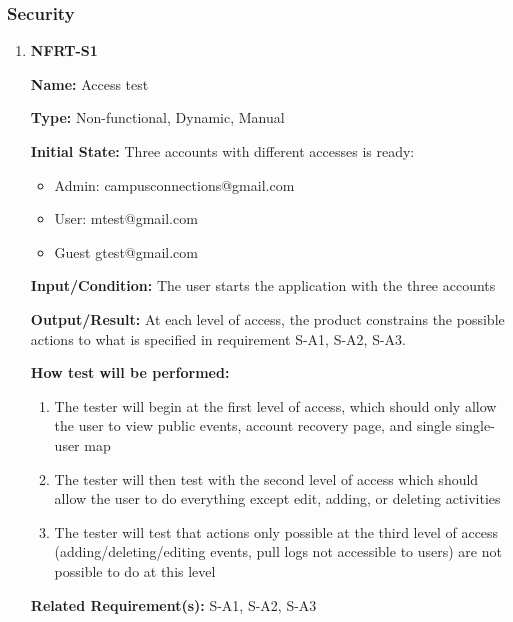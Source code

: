 \documentclass[12pt, titlepage]{article}
\begin{document}
\subsubsection{Security}

\begin{enumerate}
\item{\textbf{NFRT-S1}}

\textbf{Name:} Access test
  
\textbf{Type:} Non-functional, Dynamic, Manual
            
\textbf{Initial State:} Three accounts with different accesses is ready:
\begin{itemize}
\item Admin: campusconnections@gmail.com
\item User: mtest@gmail.com
\item Guest gtest@gmail.com
\end{itemize}
  
\textbf{Input/Condition:} The user starts the application with the three accounts
            
\textbf{Output/Result:} At each level of access, the product constrains the possible actions to what is specified in requirement S-A1, S-A2, S-A3.
  
\textbf{How test will be performed:}
\begin{enumerate}
  \item The tester will begin at the first level of access, which should only allow the user to view public events,  account recovery page, and single single-user map
  \item The tester will then test with the second level of access which should allow the user to do everything except edit, adding, or deleting activities
  \item The tester will test that actions only possible at the third level of access (adding/deleting/editing events, pull logs not accessible to users) are not possible to do at this level
\end{enumerate}

\textbf{Related Requirement(s):} S-A1, S-A2, S-A3
\end{enumerate}
\end{document}
